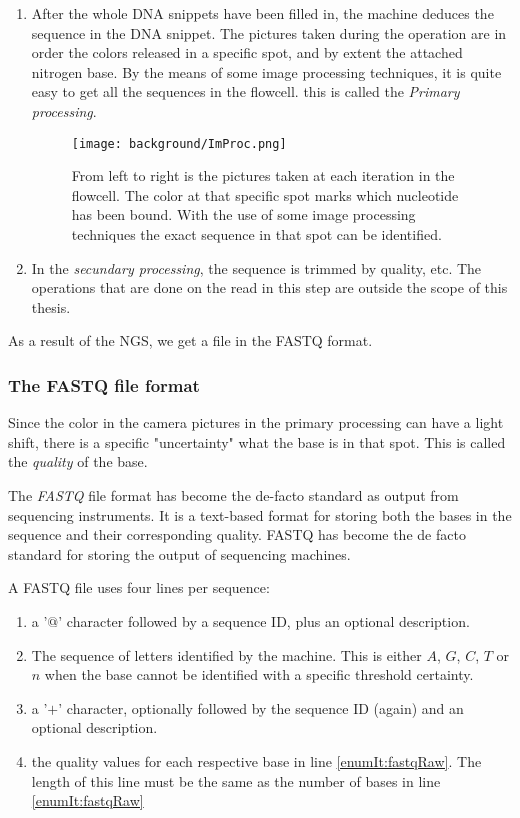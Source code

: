 \begin{enumerate}
	\item After the whole DNA snippets have been filled in, the machine deduces the sequence in the DNA snippet. The pictures taken during the operation are in order the colors released in a specific spot, and by extent the attached nitrogen base. By the means of some image processing techniques, it is quite easy to get all the sequences in the flowcell. this is called the \emph{Primary processing}.
	
	\begin{figure}[H]
		\centering
		\texttt{[image: background/ImProc.png]}
		\caption{From left to right is the pictures taken at each iteration in the flowcell. The color at that specific spot marks which nucleotide has been bound. With the use of some image processing techniques the exact sequence in that spot can be identified.}
		\label{fig:ImProc}
	\end{figure}
	
	\item In the \emph{secundary processing}, the sequence is trimmed by quality, etc. The operations that are done on the read in this step are outside the scope of this thesis.
\end{enumerate}

As a result of the NGS, we get a file in the FASTQ format.

\subsubsection{The FASTQ file format}

Since the color in the camera pictures in the primary processing can have a light shift, there is a specific "uncertainty" what the base is in that spot. This is called the \emph{quality} of the base.

The \emph{FASTQ} file format has become the de-facto standard as output from sequencing instruments. It is a text-based format for storing both the bases in the sequence and their corresponding quality. FASTQ has become the de facto standard for storing the output of sequencing machines.

A FASTQ file uses four lines per sequence:

\begin{enumerate}
	\item a '$@$' character followed by a sequence ID, plus an optional description.
	\item \label{enumIt:fastqRaw} The sequence of letters identified by the machine. This is either $A$, $G$, $C$, $T$ or $n$ when the base cannot be identified with a specific threshold certainty.
	\item a '$+$' character, optionally followed by the sequence ID (again) and an optional description.
	\item the quality values for each respective base in line \ref{enumIt:fastqRaw}. The length of this line must be the same as the number of bases in line \ref{enumIt:fastqRaw}
\end{enumerate}

